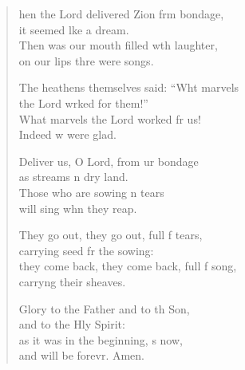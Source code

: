 \begin{verse}
  \begin{patverse}
hen the Lord delivered Zion frm bondage,\Med\\
it seemed l\pointup{\i}ke a dream.\\
Then was our mouth filled w\pointup{\i}th laughter,\Med\\
on our lips thre were songs.

The heathens themselves said: “Wht marvels\Med\\
the Lord wrked for them!”\\
What marvels the Lord worked fr us!\Med\\
Indeed w were glad.

Deliver us, O Lord, from ur bondage\Med\\
as streams \pointup{\i}n dry land.\\
Those who are sowing \pointup{\i}n tears\Med\\
will sing whn they reap.

They go out, they go out, full f tears,\Med\\
carrying seed fr the sowing:\\
they come back, they come back, full f song,\Med\\
carry\pointup{\i}ng their sheaves.

Glory to the Father and to th Son,\Med\\
and to the Hly Spirit:\\
as it was in the beginning, \pointup{\i}s now,\Med\\
and will be forevr. Amen. 
  \end{patverse}
\end{verse}
